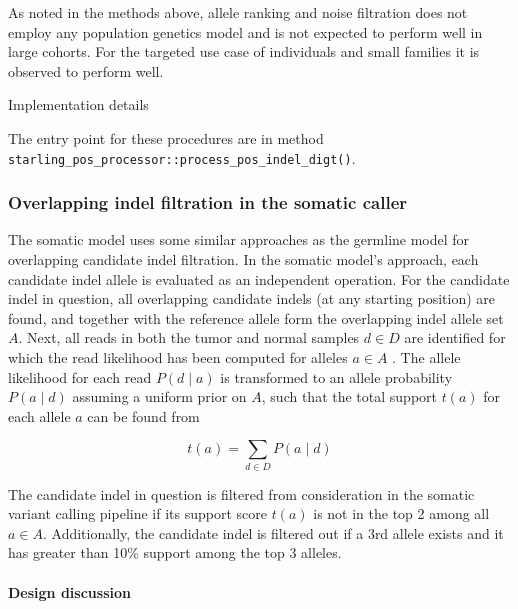\documentclass{article}
\let\IncludeDevelopmentDetail
\newenvironment{raggedParagraph}[1]
{
    \begin{paragraph} {#1}
        \raggedright
    }
    {
    \end{paragraph}
}
\begin{document}
As noted in the methods above, allele ranking and noise filtration does not employ any population genetics model and is not expected to perform well in large cohorts. For the targeted use case of individuals and small families it is observed to perform well.

\begin{raggedParagraph}{Implementation details}

    The entry point for these procedures are in method \verb|starling_pos_processor::process_pos_indel_digt()|.

\end{raggedParagraph}

\fi %


\subsubsection{Overlapping indel filtration in the somatic caller}

The somatic model uses some similar approaches as the germline model for overlapping candidate indel filtration. In the somatic model's approach, each candidate indel allele is evaluated as an independent operation. For the candidate indel in question, all overlapping candidate indels (at any starting position) are found, and together with the reference allele form the overlapping indel allele set $A$. Next, all reads in both the tumor and normal samples $d \in D$ are identified for which the read likelihood has been computed for alleles $a \in A$ . The allele likelihood for each read $P(d \mid a)$ is transformed to an allele probability $P(a \mid d)$ assuming a uniform prior on $A$, such that the total support $t(a)$ for each allele $a$ can be found from

\begin{equation*}
\label{eq:perSomaticModelAlleleSupport}
t(a) = \sum_{d \in D}{P(a \mid d)}
\end{equation*}

The candidate indel in question is filtered from consideration in the somatic variant calling pipeline if its support score $t(a)$ is not in the top 2 among all $a \in A$. Additionally, the candidate indel is filtered out if a 3rd allele exists and it has greater than 10\% support among the top 3 alleles.

\ifx\IncludeDevelopmentDetail

\paragraph{Design discussion}
\end{document}
